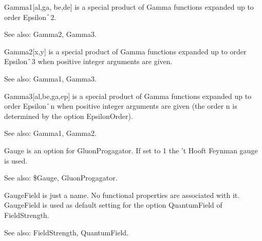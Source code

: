 




Gamma1[al,ga, be,de] is a special product of Gamma functions expanded up to order Epsilon\(\RawWedge\)2.

See also:  Gamma2, Gamma3.



Gamma2[x,y] is a special product of Gamma functions expanded up to order Epsilon\(\RawWedge\)3 when positive integer arguments are given.

See also:  Gamma1, Gamma3.



Gamma3[al,be,ga,ep] is a special product of Gamma functions expanded up to order Epsilon\(\RawWedge\)n when positive integer arguments
  are given (the order n is determined by the option EpsilonOrder).

See also:  Gamma1, Gamma2.



Gauge is an option for GluonProgagator. If set to 1 the 't Hooft Feynman gauge is used.

See also:  \${}Gauge, GluonProgagator.



GaugeField is just a name. No functional properties are associated with it. GaugeField is used as default setting for the option
  QuantumField of FieldStrength.

See also:  FieldStrength, QuantumField.




